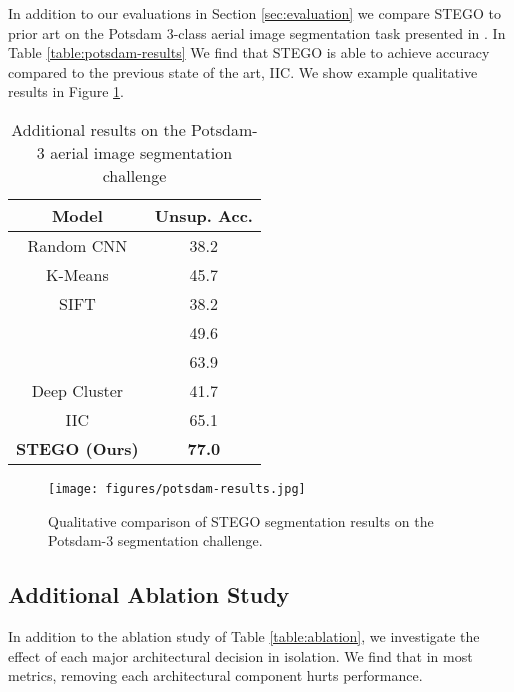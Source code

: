 \documentclass{article} \usepackage{iclr2022_conference,times}
\begin{document}
In addition to our evaluations in Section \ref{sec:evaluation} we compare STEGO to prior art on the Potsdam 3-class aerial image segmentation task presented in \cite{iic}. In Table \ref{table:potsdam-results} We find that STEGO is able to achieve  accuracy compared to the previous state of the art, IIC. We show example qualitative results in Figure \ref{fig:potsdam-results}.

\begin{table}[h]
\centering
\caption{Additional results on the Potsdam-3 aerial image segmentation challenge}
\begin{tabular}{c|c}
\textbf{Model}        & \textbf{Unsup. Acc.} \\ \hline
Random CNN  \citep{iic}          & 38.2                 \\
K-Means  \citep{pedregosa2011scikit}             & 45.7                 \\
SIFT    \citep{SIFT}              & 38.2                 \\
\cite{doersh15}              & 49.6                 \\
\cite{isola16}                 & 63.9                 \\
Deep Cluster  \citep{deep-cluster}         & 41.7                 \\
IIC \citep{iic}                   & 65.1                 \\
\textbf{STEGO (Ours)} & \textbf{77.0}       
\end{tabular}
\label{tab:potsdam-results}
\end{table}


 \begin{figure}[h]
 \centering
 \texttt{[image: figures/potsdam-results.jpg]}
  \caption{Qualitative comparison of STEGO segmentation results on the Potsdam-3 segmentation challenge.}
\label{fig:potsdam-results}
\end{figure}

\newpage

\subsection{Additional Ablation Study}

In addition to the ablation study of Table \ref{table:ablation}, we investigate the effect of each major architectural decision in isolation. We find that in most metrics, removing each architectural component hurts performance.
\end{document}
